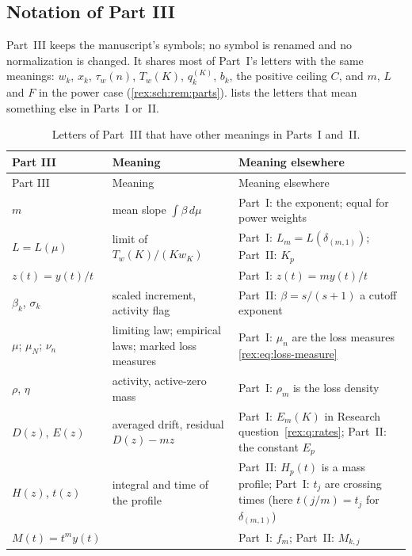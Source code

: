 \subsection{Notation of Part III}\label{rex:sch:sec:notation}

Part~III keeps the manuscript's symbols; no symbol is renamed and no
normalization is changed. It shares most of Part~I's letters with the
same meanings: $w_k$, $x_k$, $\tau_w(n)$, $T_w(K)$, $q_k^{(K)}$, $b_k$, the
positive ceiling $C$, and $m$, $L$ and $F$ in the power case
(\cref{rex:sch:rem:parts}).  lists the letters
that mean something else in Parts~I or~II.

{\small
\renewcommand{\arraystretch}{1.1}
\setlength{\LTcapwidth}{\textwidth}
\begin{longtable}{@{}>{\raggedright\arraybackslash}p{}>{\raggedright\arraybackslash}p{}>{\raggedright\arraybackslash}p{}@{}}
\caption{Letters of Part~III that have other meanings in Parts~I
and~II.}\label{rex:sch:tab:notation}\\
\toprule
Part III & Meaning & Meaning elsewhere\\
\midrule
\endfirsthead
\toprule
Part III & Meaning & Meaning elsewhere\\
\midrule
\endhead
\bottomrule
\endfoot
$m$ & mean slope $\int\beta\,d\mu$ & Part~I: the exponent; equal for power weights\\
$L=L(\mu)$ & limit of $T_w(K)/(Kw_K)$ & Part~I: $L_m=L(\delta_{(m,1)})$; Part~II: $K_p$\\
$z(t)=y(t)/t$ & & Part~I: $z(t)=my(t)/t$\\
$\beta_k$, $\sigma_k$ & scaled increment, activity flag & Part~II: $\beta=s/(s+1)$ a cutoff exponent\\
$\mu$; $\mu_N$; $\nu_n$ & limiting law; empirical laws; marked loss measures & Part~I: $\mu_n$ are the loss measures \eqref{rex:eq:loss-measure}\\
$\rho$, $\eta$ & activity, active-zero mass & Part~I: $\rho_m$ is the loss density\\
$D(z)$, $E(z)$ & averaged drift, residual $D(z)-mz$ & Part~I: $E_m(K)$ in Research question~\ref{rex:q:rates}; Part~II: the constant $E_p$\\
$H(z)$, $t(z)$ & integral and time of the profile & Part~II: $H_p(t)$ is a mass profile; Part~I: $t_j$ are crossing times (here $t(j/m)=t_j$ for $\delta_{(m,1)}$)\\
$M(t)=t^my(t)$ & & Part~I: $f_m$; Part~II: $M_{k,j}$\\

\end{longtable}}
